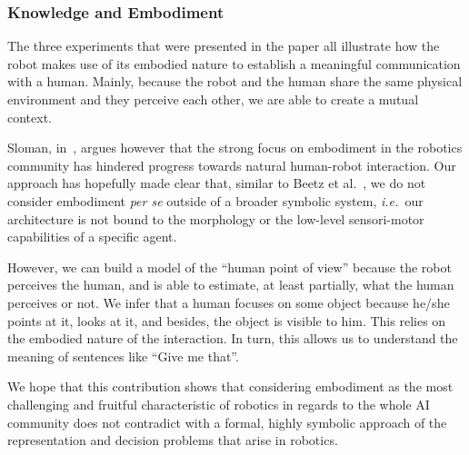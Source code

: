 \documentclass{svmult}
\newcommand{\ie}{{\textit{i.e.~}}}
\begin{document}
\subsubsection{Knowledge and Embodiment}

The three experiments that were presented in the paper all illustrate how the
robot makes use of its embodied nature to establish a meaningful communication
with a human. Mainly, because the robot and the human share the same physical
environment and they perceive each other, we are able to create a mutual
context.

Sloman, in~\cite{Sloman2009}, argues however that the strong focus on
embodiment in the robotics community has hindered progress towards natural
human-robot interaction. Our approach has hopefully made clear that, similar to
Beetz et al.~\cite{Beetz2010}, we do not consider embodiment \emph{per se} outside of
a broader symbolic system, \ie our architecture is not bound to the morphology or
the low-level sensori-motor capabilities of a specific agent. 

However, we can build a model of the ``human point of view'' because the robot
perceives the human, and is able to estimate, at least partially, what the
human perceives or not. We infer that a human focuses on some object because
he/she points at it, looks at it, and besides, the object is visible to him.
This relies on the embodied nature of the interaction. In turn, this allows us
to understand the meaning of sentences like ``Give me that''.

We hope that this contribution shows that considering embodiment as the most
challenging and fruitful characteristic of robotics in regards to the whole AI
community does not contradict with a formal, highly symbolic approach of the
representation and decision problems that arise in robotics. 
\end{document}
